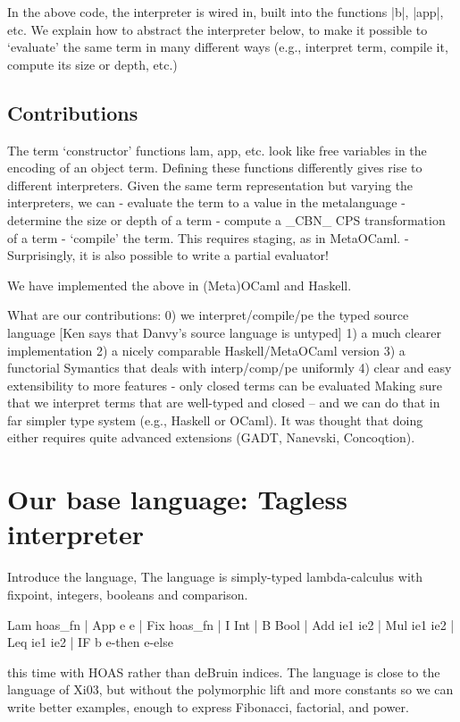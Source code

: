 In the above code, the interpreter is wired in, built into the
functions |b|, |app|, etc. We explain how to abstract the interpreter
below, to make it possible to `evaluate' the same term in many different
ways (e.g., interpret term, compile it, compute its size or depth,
etc.)

\subsection{Contributions}
The term `constructor' functions lam, app, etc. look like free
variables in the encoding of an object term.  Defining these functions
differently gives rise to different interpreters.  Given the same term
representation but varying the interpreters, we can
	- evaluate the term to a value in the metalanguage
	- determine the size or depth of a term
	- compute a _CBN_ CPS transformation of a term
	- `compile' the term. This requires staging, as in MetaOCaml.
	- Surprisingly, it is also possible to write a partial
	evaluator! 

We have implemented the above in (Meta)OCaml and Haskell.

What are our contributions:
0) we interpret/compile/pe the typed source language
   [Ken says that Danvy's source language is untyped]
1) a much clearer implementation
2) a nicely comparable Haskell/MetaOCaml version
3) a functorial Symantics that deals with interp/comp/pe uniformly
4) clear and easy extensibility to more features
- only closed terms can be evaluated
Making sure that we interpret terms that are well-typed and closed --
and we can do that in far simpler type system (e.g., Haskell or
OCaml). It was thought that doing either requires quite advanced
extensions (GADT, Nanevski, Concoqtion).


\section{Our base language: Tagless interpreter}

Introduce the language, 
  The language is simply-typed lambda-calculus with fixpoint,
  integers, booleans and comparison.

  Lam hoas_fn | App e e | Fix hoas_fn |
  I Int | B Bool | Add ie1 ie2 | Mul ie1 ie2 | Leq ie1 ie2 |
  IF b e-then e-else


this time with HOAS rather than deBruin indices. The language is close 
to the language of Xi03, but without the polymorphic lift and more 
constants so we can write better examples, enough to express
Fibonacci, factorial, and power.


